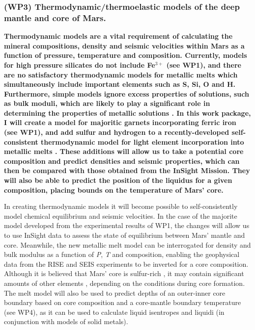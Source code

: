 \documentclass[11pt,twoside,a4paper]{article}
\begin{document}
\subsubsection*{(WP3) Thermodynamic/thermoelastic models of the deep mantle and core of Mars.}

\textbf{Thermodynamic models are a vital requirement of calculating the mineral compositions, density and seismic velocities within Mars as a function of pressure, temperature and composition. Currently, models for high pressure silicates do not include Fe$^{3+}$ (see WP1), and there are no satisfactory thermodynamic models for metallic melts which simultaneously include important elements such as S, Si, O and H. Furthermore, simple models ignore excess properties of solutions, such as bulk moduli, which are likely to play a significant role in determining the properties of metallic solutions \citep{Kom2014,WMSF2015}. In this work package, I will create a model for majoritic garnets incorporating ferric iron (see WP1), and add sulfur and hydrogen to a recently-developed self-consistent thermodynamic model for light element incorporation into metallic melts \citep{MRF2016}. These additions will allow us to take a potential core composition and predict densities and seismic properties, which can then be compared with those obtained from the InSight Mission. They will also be able to predict the position of the liquidus for a given composition, placing bounds on the temperature of Mars' core.}

In creating thermodynamic models it will become possible to self-consistently model chemical equilibrium and seismic velocities. In the case of the majorite model developed from the experimental results of WP1, the changes will allow us to use InSight data to assess the state of equilibrium between Mars' mantle and core. Meanwhile, the new metallic melt model can be interrogated for density and bulk modulus as a function of \emph{P}, \emph{T} and composition, enabling the geophysical data from the RISE and SEIS experiments to be inverted for a core composition. Although it is believed that Mars' core is sulfur-rich \citep{WD1994, KC2008}, it may contain significant amounts of other elements \citep{Stevenson2001}, depending on the conditions during core formation. The melt model will also be used to predict depths of an outer-inner core boundary based on core composition and a core-mantle boundary temperature (see WP4), as it can be used to calculate liquid isentropes and liquidi (in conjunction with models of solid metals).
\end{document}
